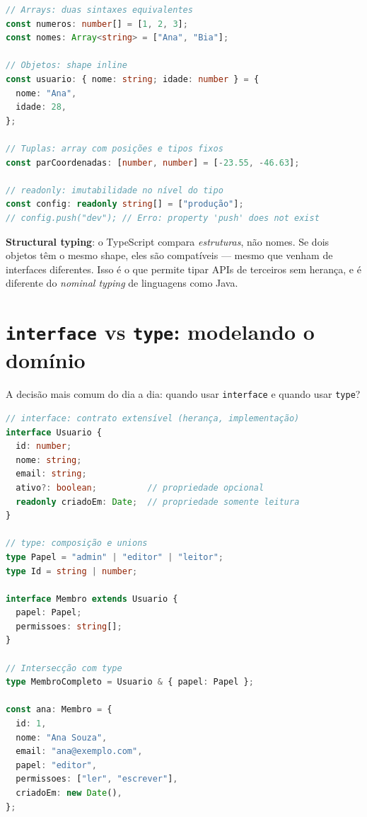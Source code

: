 \begin{lstlisting}[style=livro, language=TypeScript,
  caption={Arrays, objetos e tuplas tipados.}, label={list:ts-colecoes}]
// Arrays: duas sintaxes equivalentes
const numeros: number[] = [1, 2, 3];
const nomes: Array<string> = ["Ana", "Bia"];

// Objetos: shape inline
const usuario: { nome: string; idade: number } = {
  nome: "Ana",
  idade: 28,
};

// Tuplas: array com posições e tipos fixos
const parCoordenadas: [number, number] = [-23.55, -46.63];

// readonly: imutabilidade no nível do tipo
const config: readonly string[] = ["produção"];
// config.push("dev"); // Erro: property 'push' does not exist
\end{lstlisting}

\begin{caixaconceito}
\textbf{Structural typing}: o TypeScript compara \emph{estruturas}, não nomes.
Se dois objetos têm o mesmo shape, eles são compatíveis — mesmo que venham de
interfaces diferentes. Isso é o que permite tipar APIs de terceiros sem
herança, e é diferente do \emph{nominal typing} de linguagens como Java.
\end{caixaconceito}

\section{\texttt{interface} vs \texttt{type}: modelando o domínio}

A decisão mais comum do dia a dia: quando usar \texttt{interface} e quando
usar \texttt{type}?

\begin{lstlisting}[style=livro, language=TypeScript,
  caption={interface, type e composição.}, label={list:ts-interface}]
// interface: contrato extensível (herança, implementação)
interface Usuario {
  id: number;
  nome: string;
  email: string;
  ativo?: boolean;          // propriedade opcional
  readonly criadoEm: Date;  // propriedade somente leitura
}

// type: composição e unions
type Papel = "admin" | "editor" | "leitor";
type Id = string | number;

interface Membro extends Usuario {
  papel: Papel;
  permissoes: string[];
}

// Intersecção com type
type MembroCompleto = Usuario & { papel: Papel };

const ana: Membro = {
  id: 1,
  nome: "Ana Souza",
  email: "ana@exemplo.com",
  papel: "editor",
  permissoes: ["ler", "escrever"],
  criadoEm: new Date(),
};
\end{lstlisting}

